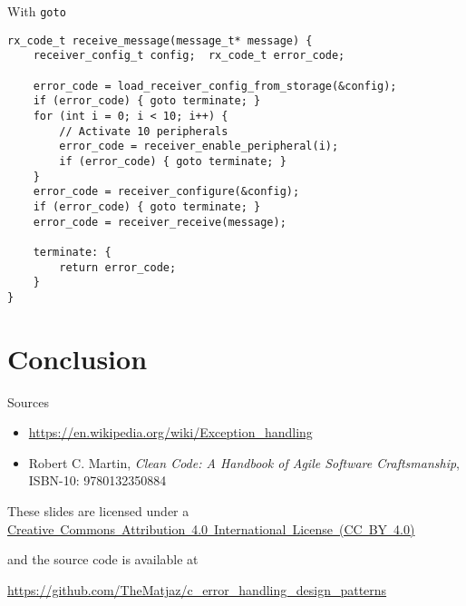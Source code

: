 \documentclass[aspectratio=169,14pt]{beamer}
\begin{document}
\begin{frame}[fragile]{With \texttt{goto}}
\begin{lstlisting}[style=cstyle]
rx_code_t receive_message(message_t* message) {
    receiver_config_t config;  rx_code_t error_code;
    
    error_code = load_receiver_config_from_storage(&config);
    if (error_code) { goto terminate; }
    for (int i = 0; i < 10; i++) {
        // Activate 10 peripherals
        error_code = receiver_enable_peripheral(i);
        if (error_code) { goto terminate; }
    }
    error_code = receiver_configure(&config);
    if (error_code) { goto terminate; }
    error_code = receiver_receive(message);
    
    terminate: {
        return error_code;
    }
}
\end{lstlisting}
\end{frame}

\section{Conclusion}

\begin{frame}{Sources}
    \begin{itemize}
        \item \url{https://en.wikipedia.org/wiki/Exception_handling}
        \item Robert C. Martin, \textit{Clean Code: A Handbook of Agile Software Craftsmanship}, ISBN-10: 9780132350884 
    \end{itemize}
    
    \begin{footnotesize}
        \begin{center}
            These slides are licensed under a \href{https://creativecommons.org/licenses/by/4.0/}{Creative~Commons~Attribution~4.0~International~License~(CC~BY~4.0)}
            
            and the source code is available at
            
            \url{https://github.com/TheMatjaz/c_error_handling_design_patterns}
        \end{center}    
    \end{footnotesize}
\end{frame}
\end{document}

